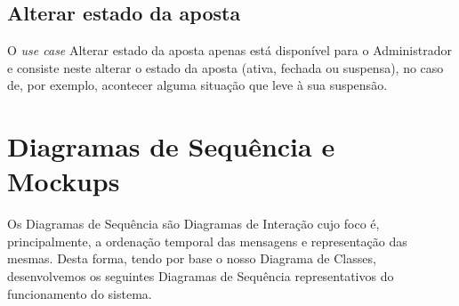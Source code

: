 \subsection{Alterar estado da aposta}
O \textit{use case} Alterar estado da aposta apenas está disponível para o Administrador e consiste neste alterar o estado da aposta (ativa, fechada ou suspensa), no caso de, por exemplo, acontecer alguma situação que leve à sua suspensão.
\begin{table}[H]
\begin{center}
\end{center}
\caption{Especificação de \textit{Use Case} Alterar estado da aposta}
\end{table}

\newpage
\section{Diagramas de Sequência e Mockups}
Os Diagramas de Sequência são Diagramas de Interação cujo foco é, principalmente, a ordenação temporal das mensagens e representação das mesmas.
Desta forma, tendo por base o nosso Diagrama de Classes, desenvolvemos os seguintes Diagramas de Sequência representativos do funcionamento do sistema.

